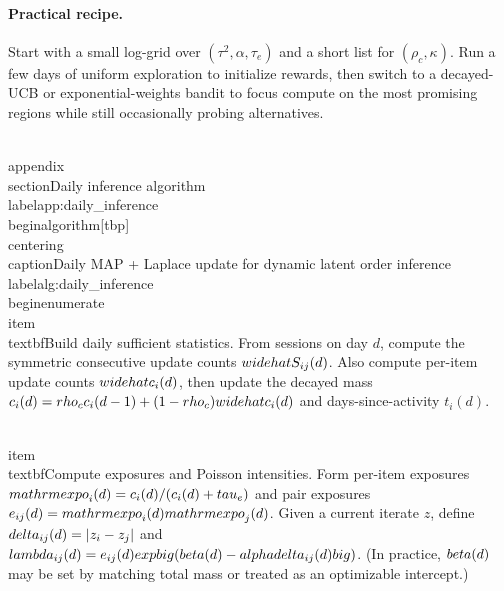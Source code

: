 \documentclass[11pt]{article}
\begin{document}
\paragraph{Practical recipe.}
Start with a small log-grid over $(\tau^2,\alpha,\tau_e)$ and a short list for $(\rho_c,\kappa)$.
Run a few days of uniform exploration to initialize rewards, then switch to a decayed-UCB or exponential-weights bandit
to focus compute on the most promising regions while still occasionally probing alternatives.

\\appendix
\\section{Daily inference algorithm}
\\label{app:daily_inference}
\\begin{algorithm}[tbp]
\\centering
\\caption{Daily MAP + Laplace update for dynamic latent order inference}
\\label{alg:daily_inference}
\\begin{enumerate}
\\item \\textbf{Build daily sufficient statistics.}
From sessions on day $d$, compute the symmetric consecutive update counts $\\widehat S_{ij}(d)$.
Also compute per-item update counts $\\widehat c_i(d)$, then update the decayed mass
$c_i(d)=\\rho_c c_i(d-1)+(1-\\rho_c)\\widehat c_i(d)$ and days-since-activity $t_i(d)$.

\\item \\textbf{Compute exposures and Poisson intensities.}
Form per-item exposures $\\mathrm{expo}_i(d)=c_i(d)/(c_i(d)+\\tau_e)$ and pair exposures
$e_{ij}(d)=\\mathrm{expo}_i(d)\\mathrm{expo}_j(d)$.
Given a current iterate $z$, define $\\delta_{ij}(d)=|z_i-z_j|$ and
$\\lambda_{ij}(d)=e_{ij}(d)\\exp\\big(\\beta(d)-\\alpha\\delta_{ij}(d)\\big)$.
(In practice, $\\beta(d)$ may be set by matching total mass or treated as an optimizable intercept.)
\end{document}
